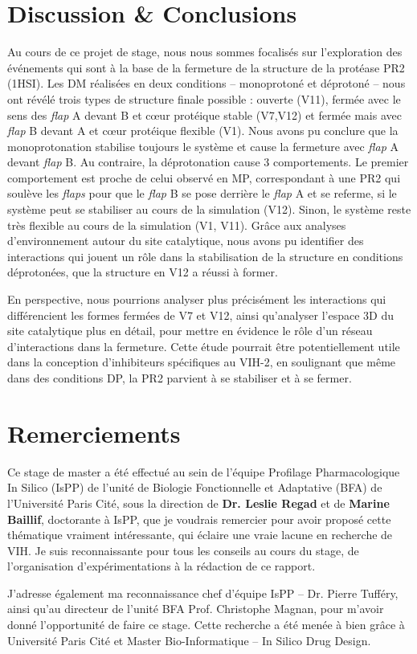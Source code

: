 \documentclass{isddmaster}
\begin{document}
	\section{Discussion \& Conclusions}
    Au cours de ce projet de stage, nous nous sommes focalisés sur l'exploration des événements qui sont à la base de la fermeture de la structure de la protéase PR2 (1HSI). Les DM réalisées en deux conditions -- monoprotoné et déprotoné -- nous ont révélé trois types de structure finale possible : ouverte (V11), fermée avec le sens des \textit{flap} A devant B et cœur protéique stable (V7,V12) et fermée mais avec \textit{flap} B devant A et cœur protéique flexible (V1).
    Nous avons pu conclure que la monoprotonation stabilise toujours le système et cause la fermeture avec \textit{flap} A devant \textit{flap} B. Au contraire, la déprotonation cause 3 comportements. Le premier comportement est proche de celui observé en MP, correspondant à une PR2 qui soulève les \textit{flaps} pour que le \textit{flap} B se pose derrière le \textit{flap} A et se referme, si le système peut se stabiliser au cours de la simulation (V12). Sinon, le système reste très flexible au cours de la simulation (V1, V11).
    Grâce aux analyses d'environnement autour du site catalytique, nous avons pu identifier des interactions qui jouent un rôle dans la stabilisation de la structure en conditions déprotonées, que la structure en V12 a réussi à former.
    \par En perspective, nous pourrions analyser plus précisément les interactions qui différencient les formes fermées de V7 et V12, ainsi qu'analyser l'espace 3D du site catalytique plus en détail, pour mettre en évidence le rôle d'un réseau d'interactions dans la fermeture.
    Cette étude pourrait être potentiellement utile dans la conception d'inhibiteurs spécifiques au VIH-2, en soulignant que même dans des conditions DP, la PR2 parvient à se stabiliser et à se fermer.
	
	\section{Remerciements}
	Ce stage de master a été effectué au sein de l'équipe Profilage Pharmacologique In Silico (IsPP) de l'unité de Biologie Fonctionnelle et Adaptative (BFA) de l'Université Paris Cité, sous la direction de \textbf{Dr. Leslie Regad} et de \textbf{Marine Baillif}, doctorante à IsPP, que je voudrais remercier pour avoir proposé cette thématique vraiment intéressante, qui éclaire une vraie lacune en recherche de VIH. Je suis reconnaissante pour tous les conseils au cours du stage, de l'organisation d'expérimentations à la rédaction de ce rapport. \par
	J'adresse également ma reconnaissance chef d'équipe IsPP -- Dr. Pierre Tufféry, ainsi qu'au directeur de l’unité BFA Prof. Christophe Magnan, pour m’avoir donné l’opportunité de faire ce stage.
	Cette recherche a été menée à bien grâce à Université Paris Cité et Master Bio-Informatique -- In Silico Drug Design. 
	
\end{document}
